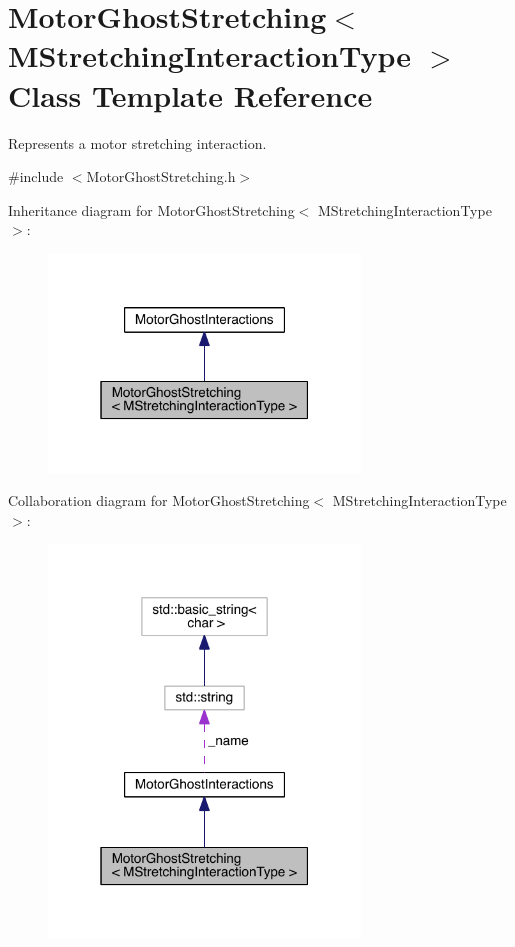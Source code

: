 \hypertarget{classMotorGhostStretching}{\section{Motor\+Ghost\+Stretching$<$ M\+Stretching\+Interaction\+Type $>$ Class Template Reference}
\label{classMotorGhostStretching}
}


Represents a motor stretching interaction.  




{\ttfamily \#include $<$Motor\+Ghost\+Stretching.\+h$>$}



Inheritance diagram for Motor\+Ghost\+Stretching$<$ M\+Stretching\+Interaction\+Type $>$\+:\nopagebreak
\begin{figure}[H]
\begin{center}
\leavevmode
\includegraphics[width=235pt]{classMotorGhostStretching__inherit__graph}
\end{center}
\end{figure}


Collaboration diagram for Motor\+Ghost\+Stretching$<$ M\+Stretching\+Interaction\+Type $>$\+:\nopagebreak
\begin{figure}[H]
\begin{center}
\leavevmode
\includegraphics[width=235pt]{classMotorGhostStretching__coll__graph}
\end{center}
\end{figure}
